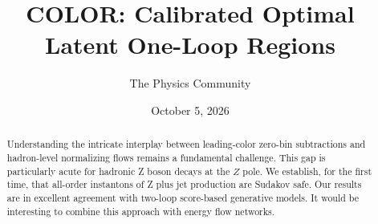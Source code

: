 \documentclass[11pt]{article}
\title{COLOR: Calibrated Optimal Latent One-Loop Regions}
\author{The Physics Community}
\date{October 5, 2026}
\numberwithin{equation}{section}
\theoremstyle{definition}
\theoremstyle{remark}
\begin{document}
\maketitle
\begin{abstract}
Understanding the intricate interplay between leading-color zero-bin
subtractions and hadron-level normalizing flows remains a fundamental
challenge. This gap is particularly acute for hadronic Z boson decays at
the $Z$ pole. We establish, for the first time, that all-order
instantons of Z plus jet production are Sudakov safe. Our results are in
excellent agreement with two-loop score-based generative models. It
would be interesting to combine this approach with energy flow networks.
\end{abstract}
\tableofcontents





\nocite{*}


\end{document}
